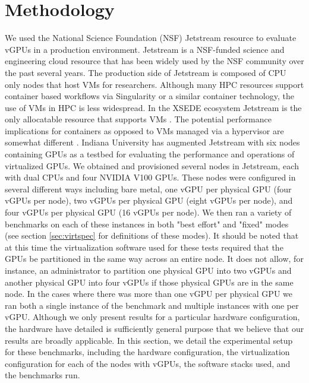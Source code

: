 \documentclass[acmsmall, authorversion]{acmart}
\begin{document}
\section{Methodology} \label{sec:method}
We used the National Science Foundation (NSF) Jetstream resource \cite{jetstream1, jetstream2} to evaluate vGPUs in a production environment. Jetstream is a NSF-funded science and engineering cloud resource that has been widely used by the NSF community over the past several years. The production side of Jetstream is composed of CPU only nodes that host VMs for researchers. Although many HPC resources support container based workflows via Singularity or a similar container technology, the use of VMs in HPC is less widespread. In the XSEDE ecosystem Jetstream is the only allocatable resource that supports VMs \cite{xsederesources}. The potential performance implications for containers as opposed to VMs managed via a hypervisor are somewhat different \cite{containers}. Indiana University has augmented Jetstream with six nodes containing GPUs as a testbed for evaluating the performance and operations of virtualized GPUs. We obtained and provisioned several nodes in Jetstream, each with dual CPUs and four NVIDIA V100 GPUs. These nodes were configured in several different ways including bare metal, one vGPU per physical GPU (four vGPUs per node), two vGPUs per physical GPU (eight vGPUs per node), and four vGPUs per physical GPU (16 vGPUs per node). We then ran a variety of benchmarks on each of these instances in both "best effort" and "fixed" modes (see section \ref{sec:virtspec} for definitions of these modes). It should be noted that at this time the virtualization software used for these tests required that the GPUs be partitioned in the same way across an entire node. It does not allow, for instance, an administrator to partition one physical GPU into two vGPUs and another physical GPU into four vGPUs if those physical GPUs are in the same node. In the cases where there was more than one vGPU per physical GPU we ran both a single instance of the benchmark and multiple instances with one per vGPU. Although we only present results for a particular hardware configuration, the hardware have detailed is sufficiently general purpose that we believe that our results are broadly applicable. In this section, we detail the experimental setup for these benchmarks, including the hardware configuration, the virtualization configuration for each of the nodes with vGPUs, the software stacks used, and the benchmarks run.
\end{document}
